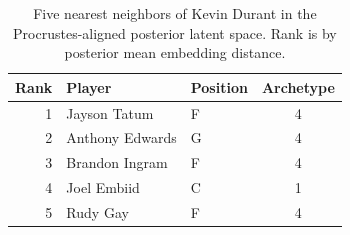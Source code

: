\begin{table}[htbp]
  \centering\small
  \begin{tabular}{rllc}
    \toprule
    Rank & Player & Position & Archetype \\
    \midrule
    1 & Jayson Tatum & F & 4 \\
    2 & Anthony Edwards & G & 4 \\
    3 & Brandon Ingram & F & 4 \\
    4 & Joel Embiid & C & 1 \\
    5 & Rudy Gay & F & 4 \\
    \bottomrule
  \end{tabular}
  \caption{Five nearest neighbors of Kevin Durant in the Procrustes-aligned posterior latent space. Rank is by posterior mean embedding distance.}
  \label{tab:Kevin_Durant_neighbors}
\end{table}


